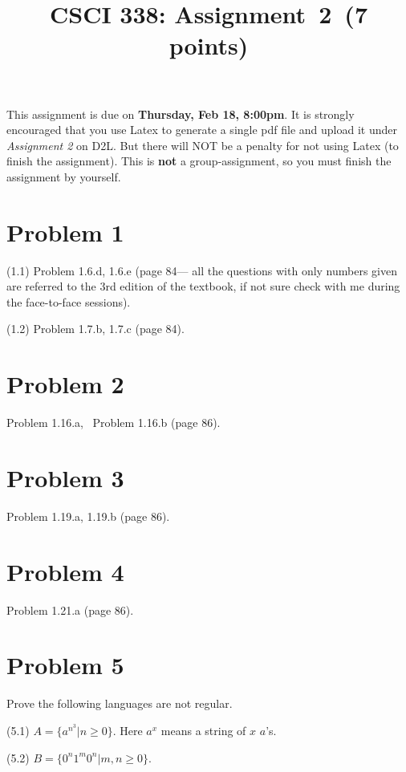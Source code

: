 \documentclass[11pt]{article}
\begin{document}
\date{}

\title{CSCI 338: Assignment~2~(7 points)}



\maketitle

\noindent
This assignment is due on {\bf Thursday, Feb 18, 8:00pm}. It is strongly
encouraged that you use Latex to generate a single pdf file and upload it
under {\em Assignment 2} on D2L. But there will NOT be a penalty for not
using Latex (to finish the assignment). This is {\bf not} a group-assignment,
so you must finish the assignment by yourself.

\section*{Problem 1}

\noindent
(1.1) Problem 1.6.d, 1.6.e (page 84---
all the questions with only numbers given are referred to the 3rd edition of the textbook, if not sure check with me during the face-to-face sessions).
\newline

\noindent
(1.2) Problem 1.7.b, 1.7.c (page 84).
\newline

\section*{Problem 2}

Problem 1.16.a, ~Problem 1.16.b (page 86).
\newline

\section*{Problem 3}

Problem 1.19.a, 1.19.b (page 86).
\newline

\section*{Problem 4}

Problem 1.21.a (page 86).
\newline

\section*{Problem 5}

Prove the following languages are not regular.

(5.1) $A=\{a^{n^3}|n\geq 0\}$. Here $a^x$ means a string of $x$ $a$'s.
\newline

(5.2) $B=\{0^n1^m0^n|m,n\geq 0\}$.
\newline
\end{document}
